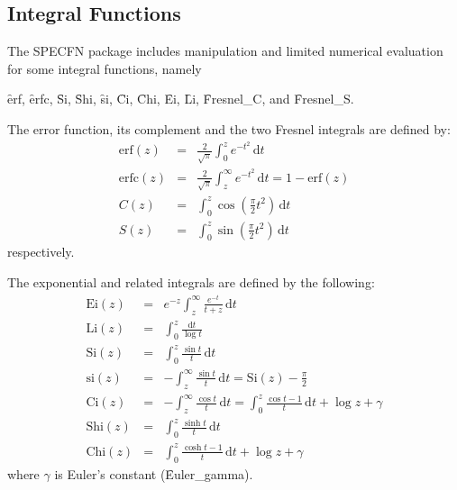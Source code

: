 \subsection{Integral Functions}
\hypertarget{operator:CHI}{}
\hypertarget{operator:CI}{}
\hypertarget{operator:DILOG}{}
\hypertarget{operator:EI}{}
\hypertarget{operator:Erf}{}
\hypertarget{operator:SI}{}
\hypertarget{operator:Shi}{}
\hypertarget{operator:Fresnel_S}{}
\hypertarget{operator:Fresnel_C}{}
\hypertarget{INTEGF}{}

The SPECFN package includes manipulation and limited numerical
evaluation for some integral functions, namely

\f{erf}, \f{erfc}, \f{Si}, \f{Shi}, \f{si}, \f{Ci}, \f{Chi}, \f{Ei}, \f{Li},
\f{Fresnel\_C}, and \f{Fresnel\_S}.

The error function, its complement and the two Fresnel integrals are defined by:
\begin{eqnarray*}
\mathrm{erf}(z) & = & \frac{2}{\sqrt \pi}\int_0^z e^{-t^2}\, \mathrm{d}t\\
\mathrm{erfc}(z) & = & \frac{2}{\sqrt \pi}\int_z^\infty e^{-t^2}\, \mathrm{d}t
 = 1 - \mathrm{erf}(z)\\
C(z) & = & \int_0^z \cos\left(\frac{\pi}{2} t^2\right)\, \mathrm{d}t\\
S(z) & = & \int_0^z \sin\left(\frac{\pi}{2} t^2\right)\, \mathrm{d}t
\end{eqnarray*}
respectively.

The exponential and related integrals are defined by the following:
\begin{eqnarray*}
\mathrm{Ei}(z) & = & e^{-z}\int_z^\infty \frac{e^{-t}} {t+z}\, \mathrm{d}t\\
\mathrm{Li}(z) & = & \int_0^z \frac{\mathrm{d}t} {\log t}\\
\mathrm{Si}(z) & = & \int_0^z \frac{\sin t} {t}\, \mathrm{d}t\\
\mathrm{si}(z) & = & -\int_z^\infty \frac{\sin t} {t}\, \mathrm{d}t
 = \mathrm{Si}(z) - \frac{\pi}{2}\\
\mathrm{Ci}(z) & = & -\int_z^\infty  \frac{\cos t} {t}\, \mathrm{d}t
=  \int_0^z \frac{\cos t -1} {t}\, \mathrm{d}t + \log z +\gamma\\
\mathrm{Shi}(z) & = & \int_0^z \frac{\sinh t} {t}\, \mathrm{d}t\\
\mathrm{Chi}(z) & = & \int_0^z \frac{\cosh t -1} {t}\, \mathrm{d}t +\log z +\gamma
\end{eqnarray*}
where $\gamma$ is Euler's constant (\f{Euler\_gamma}).


